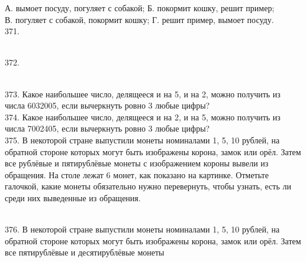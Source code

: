 \documentclass[12pt]{article}
\begin{document}
А. вымоет посуду, погуляет с собакой;  \qquad \quad Б. покормит кошку, решит пример;\\
В. погуляет с собакой, покормит кошку; \qquad  Г. решит пример, вымоет посуду.\\
371. \begin{figure}[ht!]
\end{figure}\\
372. \begin{figure}[ht!]
\end{figure}\\
373. Какое наибольшее число, делящееся и на 5, и на 2, можно получить из числа 6032005, если
вычеркнуть ровно 3 любые цифры?\\
374. Какое наибольшее число, делящееся и на 2, и на 5, можно получить из числа 7002405, если
вычеркнуть ровно 3 любые цифры?\\
375. В некоторой стране выпустили монеты номиналами 1, 5, 10 рублей, на обратной стороне которых
могут быть изображены корона, замок или орёл. Затем все рублёвые и пятирублёвые монеты с
изображением короны вывели из обращения. На столе лежат 6 монет, как показано на картинке.
Отметьте галочкой, какие монеты обязательно нужно перевернуть, чтобы узнать, есть ли среди них
выведенные из обращения.\\
\begin{figure}[ht!]
\end{figure}\\
376. В некоторой стране выпустили монеты номиналами 1, 5, 10 рублей, на обратной стороне которых
могут быть изображены корона, замок или орёл. Затем все пятирублёвые и десятирублёвые монеты
\end{document}
